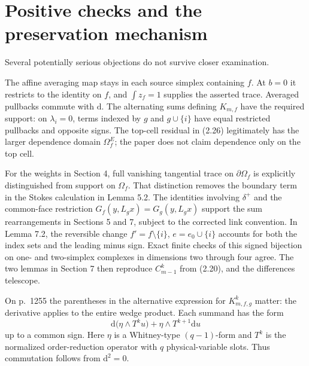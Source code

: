 \documentclass[10pt]{article}
\begin{document}
\section*{Positive checks and the preservation mechanism}
Several potentially serious objections do not survive closer examination.\par
The affine averaging map stays in each source simplex containing \(f\). At \(b=0\) it restricts to the identity on \(f\), and \(\int z_f=1\) supplies the asserted trace. Averaged pullbacks commute with \(\mathrm d\). The alternating sums defining \(K_{m,f}\) have the required support: on \(\lambda_i=0\), terms indexed by \(g\) and \(g\cup\{i\}\) have equal restricted pullbacks and opposite signs. The top-cell residual in (2.26) legitimately has the larger dependence domain \(\Omega_f^E\); the paper does not claim dependence only on the top cell.\par
For the weights in Section 4, full vanishing tangential trace on \(\partial\Omega_f\) is explicitly distinguished from support on \(\Omega_f\). That distinction removes the boundary term in the Stokes calculation in Lemma 5.2. The identities involving \(\delta^+\) and the common-face restriction \(G_f(y,L_gx)=G_g(y,L_gx)\) support the sum rearrangements in Sections 5 and 7, subject to the corrected link convention. In Lemma 7.2, the reversible change \(f'=f\setminus\{i\}\), \(e=e_0\cup\{i\}\) accounts for both the index sets and the leading minus sign. Exact finite checks of this signed bijection on one- and two-simplex complexes in dimensions two through four agree. The two lemmas in Section 7 then reproduce \(C_{m-1}^k\) from (2.20), and the differences telescope.\par
On p. 1255 the parentheses in the alternative expression for \(K_{m,f,g}^k\) matter: the derivative applies to the entire wedge product. Each summand has the form \[\mathrm d\bigl(\eta\wedge T^ku\bigr)+\eta\wedge T^{k+1}\mathrm du\] up to a common sign. Here \(\eta\) is a Whitney-type \((q-1)\)-form and \(T^k\) is the normalized order-reduction operator with \(q\) physical-variable slots. Thus commutation follows from \(\mathrm d^2=0\).\par
\end{document}
